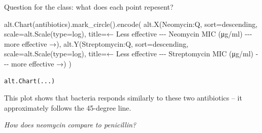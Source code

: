\documentclass[
  letterpaper,
  DIV=11,
  numbers=noendperiod]{scrartcl}
\newenvironment{Shaded}{\begin{snugshade}}{\end{snugshade}}
\newcommand{\BuiltInTok}[1]{\textcolor[rgb]{0.00,0.23,0.31}{#1}}
\newcommand{\NormalTok}[1]{\textcolor[rgb]{0.00,0.23,0.31}{#1}}
\newcommand{\OperatorTok}[1]{\textcolor[rgb]{0.37,0.37,0.37}{#1}}
\newcommand{\StringTok}[1]{\textcolor[rgb]{0.13,0.47,0.30}{#1}}
\begin{document}
Question for the class: what does each point repesent?

\begin{Shaded}
\begin{Highlighting}[]
\NormalTok{alt.Chart(antibiotics).mark\_circle().encode(}
\NormalTok{    alt.X(}\StringTok{\textquotesingle{}Neomycin:Q\textquotesingle{}}\NormalTok{,}
\NormalTok{          sort}\OperatorTok{=}\StringTok{\textquotesingle{}descending\textquotesingle{}}\NormalTok{,}
\NormalTok{          scale}\OperatorTok{=}\NormalTok{alt.Scale(}\BuiltInTok{type}\OperatorTok{=}\StringTok{\textquotesingle{}log\textquotesingle{}}\NormalTok{),}
\NormalTok{          title}\OperatorTok{=}\StringTok{\textquotesingle{}← Less effective {-}{-}{-} Neomycin MIC (μg/ml) {-}{-}{-} more effective →\textquotesingle{}}\NormalTok{),}
\NormalTok{    alt.Y(}\StringTok{\textquotesingle{}Streptomycin:Q\textquotesingle{}}\NormalTok{,}
\NormalTok{          sort}\OperatorTok{=}\StringTok{\textquotesingle{}descending\textquotesingle{}}\NormalTok{,}
\NormalTok{          scale}\OperatorTok{=}\NormalTok{alt.Scale(}\BuiltInTok{type}\OperatorTok{=}\StringTok{\textquotesingle{}log\textquotesingle{}}\NormalTok{),}
\NormalTok{          title}\OperatorTok{=}\StringTok{\textquotesingle{}← Less effective {-}{-}{-} Streptomycin MIC (μg/ml) {-}{-}{-} more effective →\textquotesingle{}}\NormalTok{)}
\NormalTok{)}
\end{Highlighting}
\end{Shaded}

\begin{verbatim}
alt.Chart(...)
\end{verbatim}

This plot shows that bacteria responds similarly to these two
antibiotics -- it approximately follows the 45-degree line.

\emph{How does neomycin compare to penicillin?}
\end{document}
